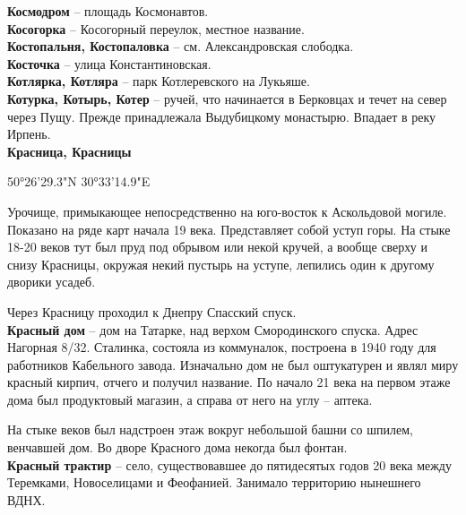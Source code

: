 \textbf{Космодром} – площадь Космонавтов.\\

\textbf{Косогорка} – Косогорный переулок, местное название.\\

\textbf{Костопальня, Костопаловка} – см.  Александровская слободка.\\

\textbf{Косточка} – улица Константиновская.\\



\textbf{Котлярка, Котляра} – парк Котлеревского на Лукьяше.\\

\textbf{Котурка, Котырь, Котер} – ручей, что начинается в Берковцах и течет на север через Пущу. Прежде принадлежала Выдубицкому монастырю. Впадает в реку Ирпень.\\

\textbf{Красница, Красницы} 

50°26'29.3"N 30°33'14.9"E

Урочище, примыкающее непосредственно на юго-восток к Аскольдовой могиле. Показано на ряде карт начала 19 века. Представляет собой уступ горы. На стыке 18-20 веков тут был пруд под обрывом или некой кручей, а вообще сверху и снизу Красницы, окружая некий пустырь на уступе, лепились один к другому дворики усадеб.

Через Красницу проходил к Днепру Спасский спуск.\\

\textbf{Красный дом} – дом на Татарке, над верхом Смородинского спуска. Адрес Нагорная 8/32. Сталинка, состояла из коммуналок, построена в 1940 году для работников Кабельного завода. Изначально дом не был оштукатурен и являл миру красный кирпич, отчего и получил название. По начало 21 века на первом этаже дома был продуктовый магазин, а справа от него на углу – аптека.

На стыке веков был надстроен этаж вокруг небольшой башни со шпилем, венчавшей дом. Во дворе Красного дома некогда был фонтан.\\    

\textbf{Красный трактир} – село, существовавшее до пятидесятых годов 20 века между Теремками, Новоселицами и Феофанией. Занимало территорию нынешнего ВДНХ.\\

